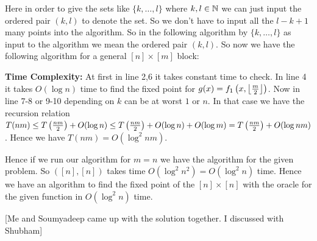 \documentclass[a4paper, 11pt]{article}
\begin{document}
{Here in order to give the sets like $\{k,\dots, l\}$ where $k,l\in\mathbb{N}$ we can just input the ordered pair $(k,l)$ to denote the set. So we don't have to input all the $l-k+1$ many points into the algorithm. So in the following algorithm by $\{k,\dots, l\}$ as input to the algorithm we mean the ordered pair $(k,l)$. So now we have the following algorithm for a general $[n]\times [m]$ block:
\begin{algorithm}
\DontPrintSemicolon
{}
\caption{$([n],[m])$}
\end{algorithm}

\textbf{Time Complexity:} At first in line 2,6 it takes constant time to check. In line 4 it takes $O(\log n)$ time to find the fixed point for $g(x)=f_1\left(x,\left\lfloor\frac{m}{2}\right\rfloor\right)$. Now in line 7-8 or 9-10 depending on $k$ can be at worst $1$ or $n$. In that case we have the recursion relation $T(nm)\leq T\left(\frac{nm}2\right)+O(\log n)\leq T\left(\frac{nm}2\right)+O(\log n)+O(\log m)=T\left(\frac{nm}2\right)+O(\log nm)$. Hence we have $T(nm)=O(\log^2 nm)$. \parinn

Hence if we run our algorithm for $m=n$ we have the algorithm for the given problem. So $([n],[n])$ takes time $O(\log^2 n^2)=O(\log^2 n)$ time. Hence we have an algorithm to find the fixed point of the $[n]\times [n]$ with the oracle for the given function in $O(\log^2n)$ time. 
}\parinf

[Me and Soumyadeep came up with the solution together. I discussed with Shubham]
\newpage



\end{document}
